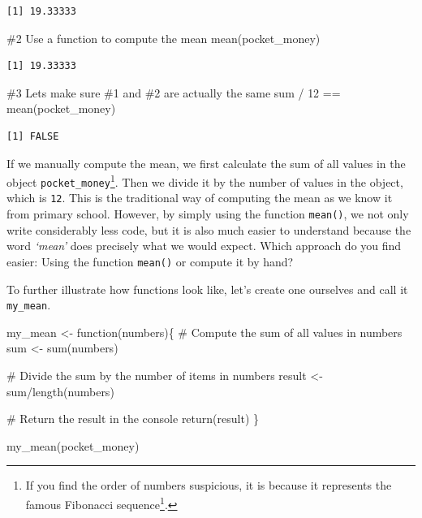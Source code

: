 \documentclass[
  letterpaper,
]{krantz}
\makeatletter
\newenvironment{Shaded}{\begin{snugshade}}{\end{snugshade}}
\newcommand{\CommentTok}[1]{\textcolor[rgb]{0.37,0.37,0.37}{#1}}
\newcommand{\ControlFlowTok}[1]{\textcolor[rgb]{0.00,0.23,0.31}{#1}}
\newcommand{\DecValTok}[1]{\textcolor[rgb]{0.68,0.00,0.00}{#1}}
\newcommand{\FunctionTok}[1]{\textcolor[rgb]{0.28,0.35,0.67}{#1}}
\newcommand{\NormalTok}[1]{\textcolor[rgb]{0.00,0.23,0.31}{#1}}
\newcommand{\OtherTok}[1]{\textcolor[rgb]{0.00,0.23,0.31}{#1}}
\newcommand{\SpecialCharTok}[1]{\textcolor[rgb]{0.37,0.37,0.37}{#1}}
\renewcommand{\href}[2]{#2\footnote{\url{#1}}}
\newenvironment{kframe}{%
\medskip{}
\setlength{\fboxsep}{.8em}
 \def\at@end@of@kframe{}%
 \ifinner\ifhmode%
  \def\at@end@of@kframe{\end{minipage}}%
  \begin{minipage}{\columnwidth}%
 \fi\fi%
 \def\FrameCommand##1{\hskip\@totalleftmargin \hskip-\fboxsep
 \colorbox{shadecolor}{##1}\hskip-\fboxsep
     \hskip-\linewidth \hskip-\@totalleftmargin \hskip\columnwidth}%
 \MakeFramed {\advance\hsize-\width
   \@totalleftmargin\z@ \linewidth\hsize
   \@setminipage}}%
 {\par\unskip\endMakeFramed%
 \at@end@of@kframe}
\renewenvironment{Shaded}{\begin{kframe}}{\end{kframe}}
\makeatother
\begin{document}
\begin{verbatim}
[1] 19.33333
\end{verbatim}

\begin{Shaded}
\begin{Highlighting}[]
\CommentTok{\#2 Use a function to compute the mean}
\FunctionTok{mean}\NormalTok{(pocket\_money)}
\end{Highlighting}
\end{Shaded}

\begin{verbatim}
[1] 19.33333
\end{verbatim}

\begin{Shaded}
\begin{Highlighting}[]
\CommentTok{\#3 Let\textquotesingle{}s make sure \#1 and \#2 are actually the same}
\NormalTok{sum }\SpecialCharTok{/} \DecValTok{12} \SpecialCharTok{==} \FunctionTok{mean}\NormalTok{(pocket\_money)}
\end{Highlighting}
\end{Shaded}

\begin{verbatim}
[1] FALSE
\end{verbatim}

If we manually compute the mean, we first calculate the sum of all
values in the object \texttt{pocket\_money}\footnote{If you find the
  order of numbers suspicious, it is because it represents the famous
  \href{https://en.wikipedia.org/wiki/Fibonacci_number}{Fibonacci
  sequence}.}. Then we divide it by the number of values in the object,
which is \texttt{12}. This is the traditional way of computing the mean
as we know it from primary school. However, by simply using the function
\texttt{mean()}, we not only write considerably less code, but it is
also much easier to understand because the word \emph{`mean'} does
precisely what we would expect. Which approach do you find easier: Using
the function \texttt{mean()} or compute it by hand?

To further illustrate how functions look like, let's create one
ourselves and call it \texttt{my\_mean}.

\begin{Shaded}
\begin{Highlighting}[]
\NormalTok{my\_mean }\OtherTok{\textless{}{-}} \ControlFlowTok{function}\NormalTok{(numbers)\{}
  \CommentTok{\# Compute the sum of all values in \textquotesingle{}numbers\textquotesingle{}}
\NormalTok{  sum }\OtherTok{\textless{}{-}} \FunctionTok{sum}\NormalTok{(numbers)}
  
  \CommentTok{\# Divide the sum by the number of items in \textquotesingle{}numbers\textquotesingle{}}
\NormalTok{  result }\OtherTok{\textless{}{-}}\NormalTok{ sum}\SpecialCharTok{/}\FunctionTok{length}\NormalTok{(numbers)}
  
  \CommentTok{\# Return the result in the console}
  \FunctionTok{return}\NormalTok{(result)}
\NormalTok{\}}

\FunctionTok{my\_mean}\NormalTok{(pocket\_money)}
\end{Highlighting}
\end{Shaded}
\end{document}
